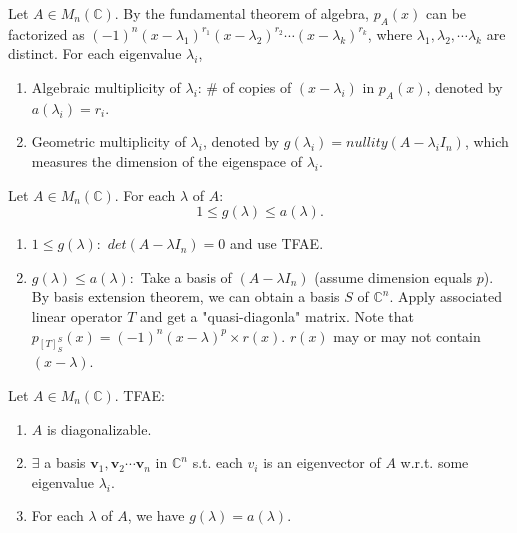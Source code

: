 \documentclass[12pt]{article}
\begin{document}
\begin{definition}
    Let $A \in M_n(\mathbb{C})$. By the fundamental theorem of algebra,
    $p_A(x)$ can be factorized as $(-1)^n(x-\lambda_1)^{r_1}(x-\lambda_2)^{r_2}\cdots(x-\lambda_k)^{r_k}$,
    where $\lambda_1,\lambda_2,\cdots\lambda_k$ are distinct. For each eigenvalue $\lambda_i$,
    \begin{enumerate}
        \item Algebraic multiplicity of $\lambda_i$: \# of copies of $(x-\lambda_i)$ in $p_A(x)$, denoted by $a(\lambda_i)=r_i$.
        \item Geometric multiplicity of $\lambda_i$, denoted by $g(\lambda_i)=nullity(A-\lambda_i I_n)$, which measures the dimension of the eigenspace of $\lambda_i$.
    \end{enumerate}
\end{definition}


\begin{theorem}
    Let $A \in M_n(\mathbb{C})$. For each $\lambda$ of $A$:
    \[1\leq g(\lambda)\leq a(\lambda).\]
\end{theorem}

\begin{pf}
    \begin{enumerate}
        \item $1\leq g(\lambda):$ $det(A-\lambda I_n)=0$ and use TFAE.
        \item $g(\lambda)\leq a(\lambda):$ Take a basis of $(A-\lambda I_n)$ (assume dimension equals $p$). By basis extension theorem, we can obtain a basis $S$ of $\mathbb{C}^n$. 
        Apply associated linear operator $T$ and get a "quasi-diagonla" matrix. Note that $p_{[T]^{S}_{S}}(x)=(-1)^n(x-\lambda)^p\times r(x)$. $r(x)$ may or may not contain $(x-\lambda)$.
    \end{enumerate}
\end{pf}


\begin{theorem}
Let $A\in M_n(\mathbb{C})$. TFAE:
\begin{enumerate}
    \item $A$ is diagonalizable.
    \item $\exists$ a basis ${\mathbf{v}_1,\mathbf{v}_2\cdots\mathbf{v}_n}$ in $\mathbb{C}^n$ s.t. each $v_i$ is an eigenvector of $A$ w.r.t. some eigenvalue $\lambda_i$.
    \item For each $\lambda$ of $A$, we have $g(\lambda)=a(\lambda)$.
\end{enumerate}
\end{theorem}
\end{document}
